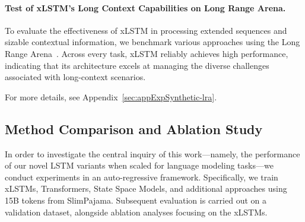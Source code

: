 \paragraph{Test of xLSTM's Long Context Capabilities on Long Range Arena.} To evaluate the effectiveness of xLSTM in processing extended sequences and sizable contextual information, we benchmark various approaches using the Long Range Arena~\citep{Tay:21}. Across every task, xLSTM reliably achieves high performance, indicating that its architecture excels at managing the diverse challenges associated with long-context scenarios.

For more details, see Appendix~\ref{sec:appExpSynthetic-lra}.

\subsection{Method Comparison and Ablation Study}
\label{sec:ExpComparison}

In order to investigate the central inquiry of this work—namely, the performance of our novel LSTM variants when scaled for language modeling tasks—we conduct experiments in an auto-regressive framework. Specifically, we train xLSTMs, Transformers, State Space Models, and additional approaches using 15B tokens from SlimPajama. Subsequent evaluation is carried out on a validation dataset, alongside ablation analyses focusing on the xLSTMs.

